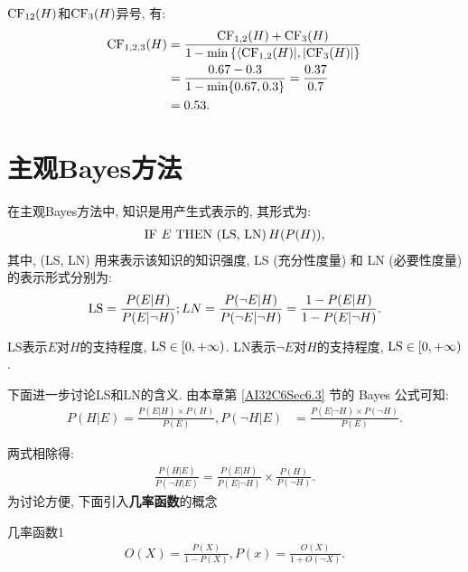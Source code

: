 $\textup{CF}_{12}(H)$和$\textup{CF}_3(H)$异号, 有:
\begin{align}
  \begin{aligned}
  \textup{CF}_{1,2,3}(H) &=\frac{\textup{CF}_{1,2}(H)+\textup{CF}_{3}(H)}{1-\min \left\{\left\langle \textup{CF}_{1,2}(H)|,| \textup{CF}_{3}(H)\right|\right\}} \\
                 &=\frac{0.67-0.3}{1-\min\{0.67,0.3\}}=\frac{0.37}{0.7} \\
                 &=0.53.
  \end{aligned}
\end{align}
\section{主观Bayes方法}
在主观Bayes方法中, 知识是用产生式表示的, 其形式为:
\begin{align}
   \textup{IF} \,\, E\,\,  \textup{THEN}\,\,  \textup{(LS, LN)}\, H(P(H)),
\end{align}
其中, \textup{(LS, LN)} 用来表示该知识的知识强度, \textup{LS} (充分性度量) 和 \textup{LN} (必要性度量) 的表示形式分别为:
\begin{align}
\begin{aligned}
    \textup{LS} =\frac{P(E | H)}{P(E | \neg H)}; LN =\frac{P(\neg E | H)}{P(\neg E | \neg H)}=\frac{1-P(E | H)}{1-P(E | \neg H)}.
\end{aligned}
\end{align}
\begin{remark}
   \textup{LS}表示$E$对$H$的支持程度, $\textup{LS}\in [0,+\infty)$. \textup{LN}表示$\neg E$对$H$的支持程度, $\textup{LS}\in [0,+\infty)$.
\end{remark}
下面进一步讨论LS和LN的含义. 由本章第 \ref{AI32C6Sec6.3} 节的 Bayes 公式可知:
\begin{align}\label{AI32C6eq6.27}
    P(H | E) =\frac{P(E | H) \times P(H)}{P(E)},  P(\neg H | E) &=\frac{P(E | \neg H) \times P(\neg H)}{P(E)}.
\end{align}

两式相除得:
\begin{align}\label{AI32C6eq6.28}
    \frac{P(H | E)}{P(\neg H | E)}=\frac{P(E | H)}{P(E | \neg H)} \times \frac{P(H)}{P(\neg H)}.
\end{align}
为讨论方便, 下面引入\textbf{几率函数}的概念
\begin{mydef}{几率函数}{1}
\begin{align}\label{AI32C6eq6.30}
    O(X)=\frac{P(X)}{1-P(X)}, P(x)=\frac{O(X)}{1+O(\neg X)}.
\end{align}
\end{mydef}

